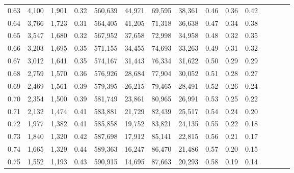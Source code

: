 \begin{tabular}{rrrcrrrrrrrrrrr}
0.63 &   4,100 &  1,901 &                                       0.32 &  560,639 &   44,971 &   69,595 &   38,361 &  0.46 &  0.36 &                         0.42 \\
0.64 &   3,766 &  1,723 &                                       0.31 &  564,405 &   41,205 &   71,318 &   36,638 &  0.47 &  0.34 &                         0.38 \\
0.65 &   3,547 &  1,680 &                                       0.32 &  567,952 &   37,658 &   72,998 &   34,958 &  0.48 &  0.32 &                         0.35 \\
0.66 &   3,203 &  1,695 &                                       0.35 &  571,155 &   34,455 &   74,693 &   33,263 &  0.49 &  0.31 &                         0.32 \\
0.67 &   3,012 &  1,641 &                                       0.35 &  574,167 &   31,443 &   76,334 &   31,622 &  0.50 &  0.29 &                         0.29 \\
0.68 &   2,759 &  1,570 &                                       0.36 &  576,926 &   28,684 &   77,904 &   30,052 &  0.51 &  0.28 &                         0.27 \\
0.69 &   2,469 &  1,561 &                                       0.39 &  579,395 &   26,215 &   79,465 &   28,491 &  0.52 &  0.26 &                         0.24 \\
0.70 &   2,354 &  1,500 &                                       0.39 &  581,749 &   23,861 &   80,965 &   26,991 &  0.53 &  0.25 &                         0.22 \\
0.71 &   2,132 &  1,474 &                                       0.41 &  583,881 &   21,729 &   82,439 &   25,517 &  0.54 &  0.24 &                         0.20 \\
0.72 &   1,977 &  1,382 &                                       0.41 &  585,858 &   19,752 &   83,821 &   24,135 &  0.55 &  0.22 &                         0.18 \\
0.73 &   1,840 &  1,320 &                                       0.42 &  587,698 &   17,912 &   85,141 &   22,815 &  0.56 &  0.21 &                         0.17 \\
0.74 &   1,665 &  1,329 &                                       0.44 &  589,363 &   16,247 &   86,470 &   21,486 &  0.57 &  0.20 &                         0.15 \\
0.75 &   1,552 &  1,193 &                                       0.43 &  590,915 &   14,695 &   87,663 &   20,293 &  0.58 &  0.19 &                         0.14 \\

\end{tabular}
